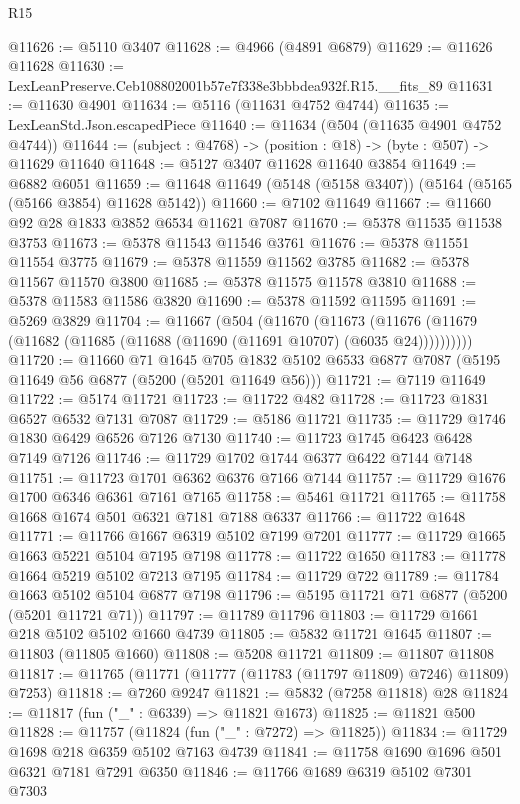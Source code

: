 \begin{lexlean}{R15}
\begin{coremodule}
{{{{{{{{{{{@11626 := @5110 @3407
@11628 := @4966 (@4891 @6879)
@11629 := @11626 @11628
@11630 := LexLeanPreserve.Ceb108802001b57e7f338e3bbbdea932f.R15.__fits_89
@11631 := @11630 @4901
@11634 := @5116 (@11631 @4752 @4744)
@11635 := LexLeanStd.Json.escapedPiece
@11640 := @11634 (@504 (@11635 @4901 @4752 @4744))
@11644 := (subject : @4768) -> (position : @18) -> (byte : @507) -> @11629 @11640
@11648 := @5127 @3407 @11628 @11640 @3854
@11649 := @6882 @6051
@11659 := @11648 @11649 (@5148 (@5158 @3407)) (@5164 (@5165 (@5166 @3854) @11628 @5142))
@11660 := @7102 @11649
@11667 := @11660 @92 @28 @1833 @3852 @6534 @11621 @7087
@11670 := @5378 @11535 @11538 @3753
@11673 := @5378 @11543 @11546 @3761
@11676 := @5378 @11551 @11554 @3775
@11679 := @5378 @11559 @11562 @3785
@11682 := @5378 @11567 @11570 @3800
@11685 := @5378 @11575 @11578 @3810
@11688 := @5378 @11583 @11586 @3820
@11690 := @5378 @11592 @11595
@11691 := @5269 @3829
@11704 := @11667
    (@504
      (@11670
        (@11673 (@11676 (@11679 (@11682 (@11685 (@11688 (@11690 (@11691 @10707) (@6035 @24))))))))))
@11720 := @11660
    @71
    @1645
    @705
    @1832
    @5102
    @6533
    @6877
    @7087
    (@5195 @11649 @56 @6877 (@5200 (@5201 @11649 @56)))
@11721 := @7119 @11649
@11722 := @5174 @11721
@11723 := @11722 @482
@11728 := @11723 @1831 @6527 @6532 @7131 @7087
@11729 := @5186 @11721
@11735 := @11729 @1746 @1830 @6429 @6526 @7126 @7130
@11740 := @11723 @1745 @6423 @6428 @7149 @7126
@11746 := @11729 @1702 @1744 @6377 @6422 @7144 @7148
@11751 := @11723 @1701 @6362 @6376 @7166 @7144
@11757 := @11729 @1676 @1700 @6346 @6361 @7161 @7165
@11758 := @5461 @11721
@11765 := @11758 @1668 @1674 @501 @6321 @7181 @7188 @6337
@11766 := @11722 @1648
@11771 := @11766 @1667 @6319 @5102 @7199 @7201
@11777 := @11729 @1665 @1663 @5221 @5104 @7195 @7198
@11778 := @11722 @1650
@11783 := @11778 @1664 @5219 @5102 @7213 @7195
@11784 := @11729 @722
@11789 := @11784 @1663 @5102 @5104 @6877 @7198
@11796 := @5195 @11721 @71 @6877 (@5200 (@5201 @11721 @71))
@11797 := @11789 @11796
@11803 := @11729 @1661 @218 @5102 @5102 @1660 @4739
@11805 := @5832 @11721 @1645
@11807 := @11803 (@11805 @1660)
@11808 := @5208 @11721
@11809 := @11807 @11808
@11817 := @11765 (@11771 (@11777 (@11783 (@11797 @11809) @7246) @11809) @7253)
@11818 := @7260 @9247
@11821 := @5832 (@7258 @11818) @28
@11824 := @11817 (fun ("_" : @6339) => @11821 @1673)
@11825 := @11821 @500
@11828 := @11757 (@11824 (fun ("_" : @7272) => @11825))
@11834 := @11729 @1698 @218 @6359 @5102 @7163 @4739
@11841 := @11758 @1690 @1696 @501 @6321 @7181 @7291 @6350
@11846 := @11766 @1689 @6319 @5102 @7301 @7303
}}}}}}}}}}}
\end{coremodule}
\end{lexlean}
